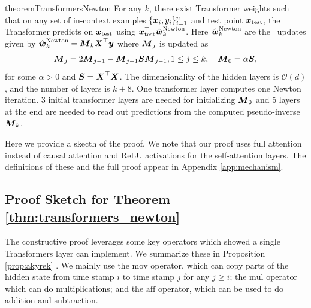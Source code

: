 \begin{restatable}{theorem}{TransformersNewton}
\label{thm:transformers_newton}
For any $k$, there exist Transformer weights such that on any set of in-context examples  $\{\boldsymbol{x}_i, y_i\}_{i=1}^n$ and test point  $\boldsymbol{x}_\mathrm{test}$, the Transformer predicts on $\boldsymbol{x}_\mathrm{test}$ using $\boldsymbol{x}_\mathrm{test}^\top \hat{\boldsymbol{w}}^\mathrm{Newton}_{k}$. Here $\hat{\boldsymbol{w}}^\mathrm{Newton}_{k}$ are the \newton\ updates given by $ \hat{\boldsymbol{w}}^\mathrm{Newton}_{k} =  \boldsymbol{M}_{k}  \boldsymbol{X}^\top \boldsymbol{y}$ where $\boldsymbol{M}_{j}$ is updated as 
\begin{align*}
    \boldsymbol{M}_{j} = 2 \boldsymbol{M}_{j-1} - \boldsymbol{M}_{j-1} \boldsymbol{S} \boldsymbol{M}_{j-1}, 1\le j\le k, \quad  \boldsymbol{M}_{0}=\alpha \boldsymbol{S}, 
\end{align*}
for some $\alpha>0$ and  $\boldsymbol{S} = \boldsymbol{X}^\top \boldsymbol{X}$. The dimensionality of the hidden layers is $\mathcal{O}(d)$, and the number of layers is $k+8$. One transformer layer computes one Newton iteration. 3 initial transformer layers are needed for initializing $\boldsymbol{M}_0$ and 5 layers at the end are needed to read out predictions from the computed pseudo-inverse $\boldsymbol{M}_k$.
\end{restatable}

Here we provide a skecth of the proof. 
We note that our proof uses full attention instead of causal attention and ReLU activations for the self-attention layers. The definitions of these and the full proof appear in Appendix \ref{app:mechanism}.



\subsection{Proof Sketch for Theorem \ref{thm:transformers_newton}}
The constructive proof leverages some key operators which \cite{Akyrek2022WhatLA} showed  a single Transformers layer can implement. We summarize these in Proposition \ref{prop:akyrek} . We mainly use the $\mathrm{mov}$ operator, which can copy parts of the hidden state from time stamp $i$ to time stamp $j$ for any $j \geq i$; the $\mathrm{mul}$ operator which can do multiplications; and the $\mathrm{aff}$ operator, which can be used to do addition and subtraction. 
